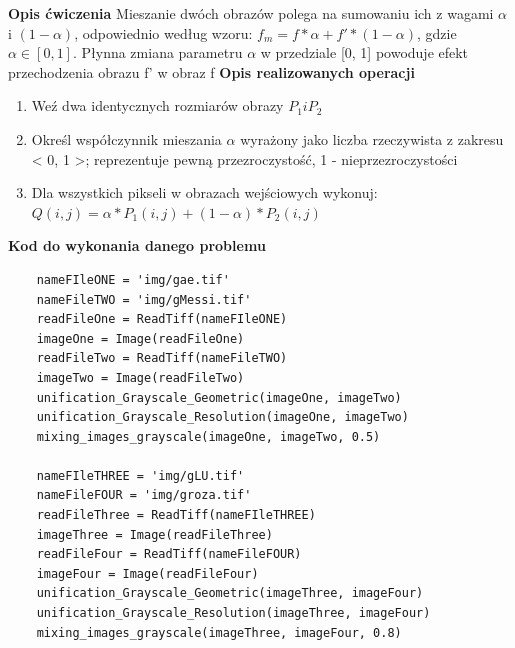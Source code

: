 \documentclass[magisterska,openany]{pracadypl}
\begin{document}
\vspace{0.5cm}\textbf{\Large Opis ćwiczenia}
\vspace{0.25cm}\newline
Mieszanie dwóch obrazów polega na sumowaniu ich z wagami $\alpha$ i $(1-\alpha)$, odpowiednio
\newline według wzoru: $f_m=f*\alpha+f'*(1-\alpha)$, gdzie $\alpha\in[0,1]$. Płynna zmiana parametru $\alpha$ w przedziale [0, 1] powoduje efekt przechodzenia obrazu f' w obraz f
\newline
\newline
\textbf{\Large Opis realizowanych operacji}
\begin{enumerate}
\item Weź dwa identycznych rozmiarów obrazy $P_1 i P_2$
\item Określ współczynnik mieszania $\alpha$ wyrażony jako liczba rzeczywista z zakresu < 0, 1 >;  reprezentuje pewną przezroczystość, 1 - nieprzezroczystości
\item Dla wszystkich pikseli w obrazach wejściowych wykonuj: $Q(i,j)=\alpha*P_1(i,j)+(1-\alpha)*P_2(i,j)$
\end{enumerate}

\vspace{0.5cm}
\textbf{\Large Kod do wykonania danego problemu}
\lstset{language=Python}
\vspace{0.25cm}
\begin{lstlisting}
	nameFIleONE = 'img/gae.tif'
	nameFileTWO = 'img/gMessi.tif'
	readFileOne = ReadTiff(nameFIleONE)
	imageOne = Image(readFileOne)
	readFileTwo = ReadTiff(nameFileTWO)
	imageTwo = Image(readFileTwo)
	unification_Grayscale_Geometric(imageOne, imageTwo)
	unification_Grayscale_Resolution(imageOne, imageTwo) 
	mixing_images_grayscale(imageOne, imageTwo, 0.5)
	
	nameFIleTHREE = 'img/gLU.tif'
	nameFileFOUR = 'img/groza.tif'
	readFileThree = ReadTiff(nameFIleTHREE)
	imageThree = Image(readFileThree)
	readFileFour = ReadTiff(nameFileFOUR)
	imageFour = Image(readFileFour)
	unification_Grayscale_Geometric(imageThree, imageFour)
	unification_Grayscale_Resolution(imageThree, imageFour)
	mixing_images_grayscale(imageThree, imageFour, 0.8)

\end{lstlisting}
\end{document}
